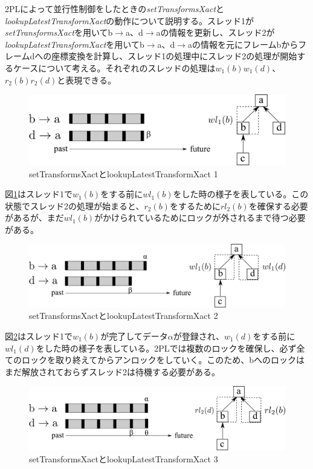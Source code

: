 \documentclass[a4paper]{jreport}	%
\begin{document}

2PLによって並行性制御をしたときの\textit{setTransformsXact}と\textit{lookupLatestTransformXact}の動作について説明する。スレッド1が\textit{setTransformsXact}を用いてb$\rightarrow$a、d$\rightarrow$aの情報を更新し、スレッド2が\textit{lookupLatestTransformXact}を用いてb$\rightarrow$a、d$\rightarrow$aの情報を元にフレームbからフレームdへの座標変換を計算し、スレッド1の処理中にスレッド2の処理が開始するケースについて考える。それぞれのスレッドの処理は$w_1(b)w_1(d)$、$r_2(b)r_2(d)$と表現できる。

\begin{figure}[h] 
\centering
\includegraphics[width=12cm]{setTransforms1}
\caption{setTransformsXactとlookupLatestTransformXact 1}
\label{fig:setTransforms1}
\end{figure}

図\ref{fig:setTransforms1}はスレッド1で$w_1(b)$をする前に$wl_1(b)$をした時の様子を表している。この状態でスレッド2の処理が始まると、$r_2(b)$をするために$rl_2(b)$を確保する必要があるが、まだ$wl_1(b)$がかけられているためにロックが外されるまで待つ必要がある。

\begin{figure}[h] 
\centering
\includegraphics[width=12cm]{setTransforms2}
\caption{setTransformsXactとlookupLatestTransformXact 2}
\label{fig:setTransforms2}
\end{figure}

図\ref{fig:setTransforms2}はスレッド1で$w_1(b)$が完了してデータ$\alpha$が登録され、$w_1(d)$をする前に$wl_1(d)$をした時の様子を表している。2PLでは複数のロックを確保し、必ず全てのロックを取り終えてからアンロックをしていく。このため、bへのロックはまだ解放されておらずスレッド2は待機する必要がある。


\begin{figure}[h] 
\centering
\includegraphics[width=12cm]{setTransforms3}
\caption{setTransformsXactとlookupLatestTransformXact 3}
\label{fig:setTransforms3}
\end{figure}
\end{document}
